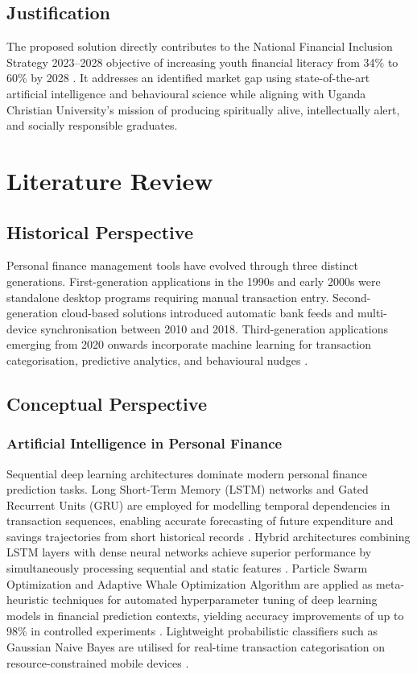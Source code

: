 \documentclass[12pt]{article}
\begin{document}
\subsection{\large Justification}
The proposed solution directly contributes to the National Financial Inclusion Strategy 2023–2028 objective of increasing youth financial literacy from 34\% to 60\% by 2028 \citep{mofped2023}. It addresses an identified market gap using state-of-the-art artificial intelligence and behavioural science while aligning with Uganda Christian University’s mission of producing spiritually alive, intellectually alert, and socially responsible graduates.

\newpage

\section{\huge \textbf{Literature Review}}
\subsection{\large Historical Perspective}
Personal finance management tools have evolved through three distinct generations. First-generation applications in the 1990s and early 2000s were standalone desktop programs requiring manual transaction entry. Second-generation cloud-based solutions introduced automatic bank feeds and multi-device synchronisation between 2010 and 2018. Third-generation applications emerging from 2020 onwards incorporate machine learning for transaction categorisation, predictive analytics, and behavioural nudges \citep{imawan2025}.

\subsection{\large Conceptual Perspective}
\subsubsection{\large Artificial Intelligence in Personal Finance}
Sequential deep learning architectures dominate modern personal finance prediction tasks. Long Short-Term Memory (LSTM) networks and Gated Recurrent Units (GRU) are employed for modelling temporal dependencies in transaction sequences, enabling accurate forecasting of future expenditure and savings trajectories from short historical records \citep{kumar2024}. Hybrid architectures combining LSTM layers with dense neural networks achieve superior performance by simultaneously processing sequential and static features \citep{vasanthakumari2025}. Particle Swarm Optimization and Adaptive Whale Optimization Algorithm are applied as meta-heuristic techniques for automated hyperparameter tuning of deep learning models in financial prediction contexts, yielding accuracy improvements of up to 98\% in controlled experiments \citep{balakrishnan2025,elhoseny2022}. Lightweight probabilistic classifiers such as Gaussian Naive Bayes are utilised for real-time transaction categorisation on resource-constrained mobile devices \citep{vasanthakumari2025}.
\end{document}
